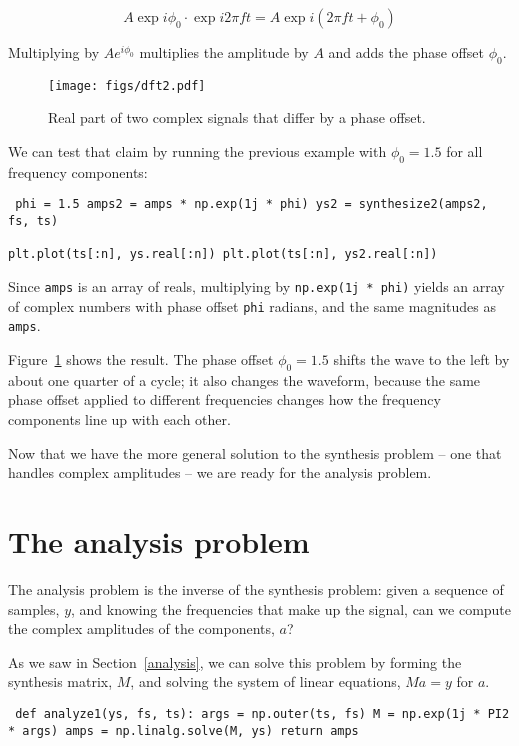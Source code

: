 \documentclass[12pt]{book} \usepackage[width=5.5in,height=8.5in, hmarginratio=3:2,vmarginratio=1:1]{geometry}
\begin{document}
%
\[ A \exp{i \phi_0} \cdot \exp{i 2 \pi f t} = A \exp{i (2 \pi f t + \phi_0)} \] 

%
Multiplying by $A e^{i \phi_0}$ multiplies the amplitude by $A$ and adds the phase offset $\phi_0$. 

\begin{figure} 

\centerline{\texttt{[image: figs/dft2.pdf]}} \caption{Real part of two complex signals that differ by a phase offset.} \label{fig.dft2} \end{figure} 

We can test that claim by running the previous example with $\phi_0 = 1.5$ for all frequency components: 

\begin{verbatim} phi = 1.5 amps2 = amps * np.exp(1j * phi) ys2 = synthesize2(amps2, fs, ts) 

plt.plot(ts[:n], ys.real[:n]) plt.plot(ts[:n], ys2.real[:n]) \end{verbatim} 

Since {\tt amps} is an array of reals, multiplying by {\tt np.exp(1j * phi)} yields an array of complex numbers with phase offset {\tt phi} radians, and the same magnitudes as {\tt amps}. 

Figure~\ref{fig.dft2} shows the result. The phase offset $\phi_0 = 1.5$ shifts the wave to the left by about one quarter of a cycle; it also changes the waveform, because the same phase offset applied to different frequencies changes how the frequency components line up with each other. 

Now that we have the more general solution to the synthesis problem -- one that handles complex amplitudes -- we are ready for the analysis problem. 

\section{The analysis problem} 

The analysis problem is the inverse of the synthesis problem: given a sequence of samples, $y$, and knowing the frequencies that make up the signal, can we compute the complex amplitudes of the components, $a$? 

As we saw in Section~\ref{analysis}, we can solve this problem by forming the synthesis matrix, $M$, and solving the system of linear equations, $M a = y$ for $a$. 

\begin{verbatim} def analyze1(ys, fs, ts): args = np.outer(ts, fs) M = np.exp(1j * PI2 * args) amps = np.linalg.solve(M, ys) return amps \end{verbatim} 
\end{document}
